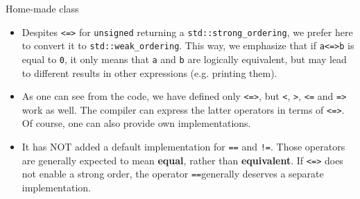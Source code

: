 \begin{frame}[fragile]
  \begin{block}{Home-made class}
    \begin{itemize}
      \item Despites \texttt{<=>} for \texttt{unsigned} returning a \texttt{std::strong_ordering}, we prefer here to convert it to \texttt{std::weak_ordering}. This way, we emphasize that if \texttt{a<=>b} is equal to \texttt{0}, it only means that \texttt{a} and \texttt{b} are logically equivalent, but may lead to different results in other expressions (e.g. printing them).
      \item As one can see from the code, we have defined only \texttt{<=>}, but \texttt{<}, \texttt{>}, \texttt{<=} and \texttt{=>} work as well. The compiler can express the latter operators in terms of \texttt{<=>}. Of course, one can also provide own implementations.
      \item It has NOT added a default implementation for \texttt{==} and \texttt{!=}. Those operators are generally expected to mean \textbf{equal}, rather than \textbf{equivalent}. If \texttt{<=>} does not enable a strong order, the operator \texttt{==}generally deserves a separate implementation.
    \end{itemize}
  \end{block}
\end{frame}

